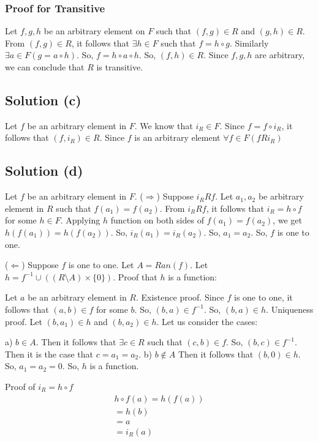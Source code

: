 \documentclass{article}
\begin{document}
\subsubsection{Proof for Transitive}
Let $f,g,h$ be an arbitrary element on $F$ such that $(f,g) \in R$ and
$(g,h) \in R$. From $(f,g) \in R$, it follows that $\exists h \in F$
such that $f = h \circ g$. Similarly $\exists a \in F(g = a \circ h)$.
So, $f = h \circ a \circ h$. So, $(f,h) \in R$. Since $f,g,h$ are
arbitrary, we can conclude that $R$ is transitive.

\subsection{Solution (c)}
Let $f$ be an arbitrary element in $F$. We know that $i_R \in F$.
Since $f = f \circ i_R$, it follows that $(f,i_R) \in R$. Since $f$ is
an arbitrary element $\forall f \in F(fRi_R)$

\subsection{Solution (d)}
Let $f$ be an arbitrary element in $F$.
($\Rightarrow$) Suppose $i_RRf$. Let $a_1, a_2$ be arbitrary element
in $R$ such that $f(a_1) = f(a_2)$. From $i_RRf$, it follows that $i_R
= h \circ f$ for some $h \in F$. Applying $h$ function on both sides
of $f(a_1) = f(a_2)$, we get $h(f(a_1)) = h(f(a_2))$. So, $i_R(a_1) =
i_R(a_2)$. So, $a_1 = a_2$. So, $f$ is one to one.

($\Leftarrow$) Suppose $f$ is one to one. Let $A = Ran(f)$. Let $h =
f^{-1} \cup ((R \setminus A) \times \{0\})$. Proof that $h$ is a
function:

Let $a$ be an arbitrary element in $R$.
Existence proof. Since $f$ is one to one, it follows that $(a,b) \in
f$ for some $b$. So, $(b,a) \in f^{-1}$. So, $(b,a) \in h$.
Uniqueness proof. Let $(b,a_1) \in h$ and $(b,a_2) \in h$. Let us
consider the cases:

a) $b \in A$. Then it follows that $\exists c \in R$ such that $(c,b)
\in f$. So, $(b,c) \in f^{-1}$. Then it is the case that $c = a_1 =
a_2$.
b) $b \notin A$ Then it follows that $(b,0) \in h$. So, $a_1 = a_2 =
0$. So, $h$ is a function.

Proof of $i_R = h \circ f$
\begin{align*}
  h \circ f(a) = h(f(a)) \\
  = h(b) \\
  = a \\
  = i_R(a)  
\end{align*}
\end{document}
